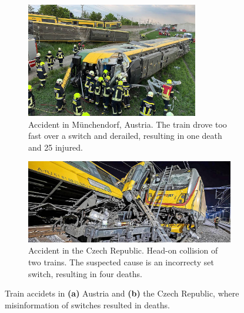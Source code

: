 \begin{figure}[H]
    \centering
    \begin{subfigure}{0.48\textwidth}
        \includegraphics[width=\linewidth, height=5cm, keepaspectratio]{PICs/Introduction/unfallMuenchedorf.jpg}
        \caption{Accident in Münchendorf, Austria. The train drove too fast over a switch and derailed, resulting in one death and 25 injured. \cite{zugUnfall1Tod}}
        \label{fig:unfallMuenchedorf}
    \end{subfigure}
    \hfill
    \begin{subfigure}{0.48\textwidth}
        \includegraphics[width=\linewidth, trim={13cm 0cm 5cm 0cm}, clip]{PICs/Introduction/unfallTschechien.jpg} %
        \caption{Accident in the Czech Republic. Head-on collision of two trains. The suspected cause is an incorrecty set switch, resulting in four deaths. \cite{zugUnfallFrontal}}
        \label{fig:unfallTschechien}
    \end{subfigure}
    \caption{Train accidets in \textbf{(a)} Austria and \textbf{(b)} the Czech Republic, where misinformation of switches resulted in deaths.}
    \label{fig:zugUnfaelle}
\end{figure}

